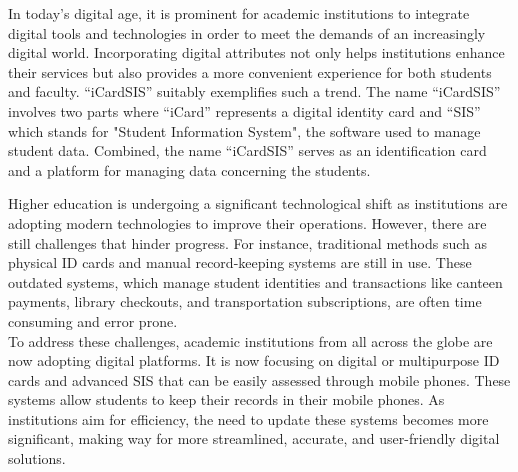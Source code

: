 \documentclass[a4paper,14pt]{article}
\begin{document}
		
		{
			\noindent \normalsize
			\justifying In today’s digital age, it is prominent for academic institutions to integrate digital tools and technologies in order to meet the demands of an increasingly digital world. Incorporating digital attributes not only helps institutions enhance their services but also provides a more convenient experience for both students and faculty. “iCardSIS” suitably exemplifies such a trend. The name “iCardSIS” involves two parts where “iCard” represents a digital identity card and “SIS” which stands for "Student Information System", the software used to manage student data. Combined, the name “iCardSIS” serves as an identification card and a platform for managing data concerning the students. 
			
			
		\vspace{0.5cm}   	
		{
			\noindent \normalsize
			\justifying 
			
			\vspace{0.5cm}  
			{
			\noindent \normalsize
			\justifying Higher education is undergoing a significant technological shift as institutions are adopting modern technologies to improve their operations. However, there are still challenges that hinder progress. For instance, traditional methods such as physical ID cards and manual record-keeping systems are still in use. These outdated systems, which manage student identities and transactions like canteen payments, library checkouts, and transportation subscriptions, are often time consuming and error prone.\\			
			To address these challenges, academic institutions from all across the globe are now adopting digital platforms. It is now focusing on digital or multipurpose ID cards and advanced SIS that can be easily assessed through mobile phones. These systems allow students to keep their records in their mobile phones. As institutions aim for efficiency, the need to update these systems becomes more significant, making way for more streamlined, accurate, and user-friendly digital solutions.
			
}}}
\end{document}
